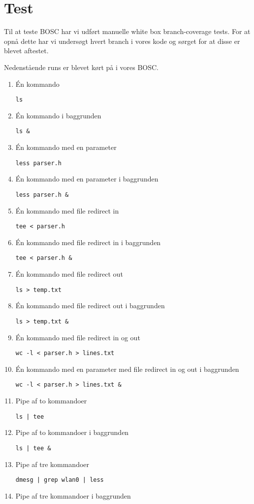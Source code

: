\section{Test}
Til at teste BOSC har vi udført manuelle white box branch-coverage tests. For at opnå dette har vi undersøgt hvert branch i vores kode og sørget for at disse er blevet aftestet.

Nedenstående runs er blevet kørt på i vores BOSC.

\begin{enumerate}
	\item Én kommando
	
	\texttt{ls}
	\item Én kommando i baggrunden
	
	\texttt{ls \&}
	\item Én kommando med en parameter
	
	\texttt{less parser.h}
	\item Én kommando med en parameter i baggrunden
	
	\texttt{less parser.h \&}
	\item Én kommando med file redirect in
	
	\texttt{tee < parser.h}
	\item Én kommando med file redirect in i baggrunden
	
	\texttt{tee < parser.h \&}
	\item Én kommando med file redirect out
	
	\texttt{ls > temp.txt}
	\item Én kommando med file redirect out i baggrunden
	
	\texttt{ls > temp.txt \&}
	\item Én kommando med file redirect in og out
	
	\texttt{wc -l < parser.h > lines.txt}
	\item Én kommando med en parameter med file redirect in og out i baggrunden
	
	\texttt{wc -l < parser.h > lines.txt \&}
	\item Pipe af to kommandoer
	
	\texttt{ls | tee}
	\item Pipe af to kommandoer i baggrunden
	
	\texttt{ls | tee \&}
	\item Pipe af tre kommandoer
	
	\texttt{dmesg | grep wlan0 | less}
	\item Pipe af tre kommandoer i baggrunden
	

\end{enumerate}
